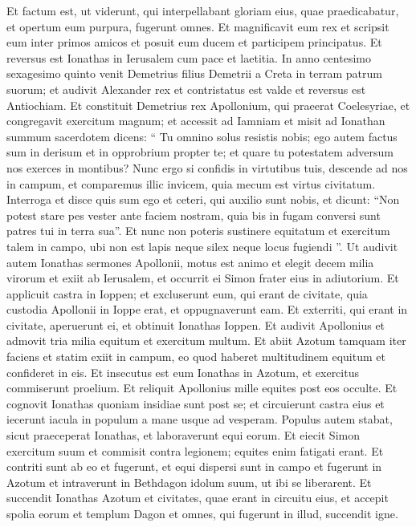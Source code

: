 \begin{biblechapter}
\begin{biblechapter}
\begin{biblechapter}
\begin{biblechapter}
\begin{biblechapter}
\begin{biblechapter}
\begin{biblechapter}
\begin{biblechapter}
\begin{biblechapter}
\begin{biblechapter}
\verse Et factum est, ut viderunt, qui interpellabant gloriam eius, quae praedicabatur, et opertum eum purpura, fugerunt omnes. 
\verse Et magnificavit eum rex et scripsit eum inter primos amicos et posuit eum ducem et participem principatus. 
\verse Et reversus est Ionathas in Ierusalem cum pace et laetitia.
 \verse In anno centesimo sexagesimo quinto venit Demetrius filius Demetrii a Creta in terram patrum suorum; 
\verse et audivit Alexander rex et contristatus est valde et reversus est Antiochiam. 
\verse Et constituit Demetrius rex Apollonium, qui praeerat Coelesyriae, et congregavit exercitum magnum; et accessit ad Iamniam et misit ad Ionathan summum sacerdotem 
\verse dicens: “ Tu omnino solus resistis nobis; ego autem factus sum in derisum et in opprobrium propter te; et quare tu potestatem adversum nos exerces in montibus? 
\verse Nunc ergo si confidis in virtutibus tuis, descende ad nos in campum, et comparemus illic invicem, quia mecum est virtus civitatum. 
\verse Interroga et disce quis sum ego et ceteri, qui auxilio sunt nobis, et dicunt: “Non potest stare pes vester ante faciem nostram, quia bis in fugam conversi sunt patres tui in terra sua”. 
\verse Et nunc non poteris sustinere equitatum et exercitum talem in campo, ubi non est lapis neque silex neque locus fugiendi ”.
 \verse Ut audivit autem Ionathas sermones Apollonii, motus est animo et elegit decem milia virorum et exiit ab Ierusalem, et occurrit ei Simon frater eius in adiutorium. 
\verse Et applicuit castra in Ioppen; et excluserunt eum, qui erant de civitate, quia custodia Apollonii in Ioppe erat, et oppugnaverunt eam. 
\verse Et exterriti, qui erant in civitate, aperuerunt ei, et obtinuit Ionathas Ioppen. 
 \verse Et audivit Apollonius et admovit tria milia equitum et exercitum multum. Et abiit Azotum tamquam iter faciens et statim exiit in campum, eo quod haberet multitudinem equitum et confideret in eis. 
\verse Et insecutus est eum Ionathas in Azotum, et exercitus commiserunt proelium. 
\verse Et reliquit Apollonius mille equites post eos occulte. 
\verse Et cognovit Ionathas quoniam insidiae sunt post se; et circuierunt castra eius et iecerunt iacula in populum a mane usque ad vesperam. 
\verse Populus autem stabat, sicut praeceperat Ionathas, et laboraverunt equi eorum. 
\verse Et eiecit Simon exercitum suum et commisit contra legionem; equites enim fatigati erant. Et contriti sunt ab eo et fugerunt, 
\verse et equi dispersi sunt in campo et fugerunt in Azotum et intraverunt in Bethdagon idolum suum, ut ibi se liberarent. 
\verse Et succendit Ionathas Azotum et civitates, quae erant in circuitu eius, et accepit spolia eorum et templum Dagon et omnes, qui fugerunt in illud, succendit igne. 

\end{biblechapter}
\end{biblechapter}
\end{biblechapter}
\end{biblechapter}
\end{biblechapter}
\end{biblechapter}
\end{biblechapter}
\end{biblechapter}
\end{biblechapter}
\end{biblechapter}
